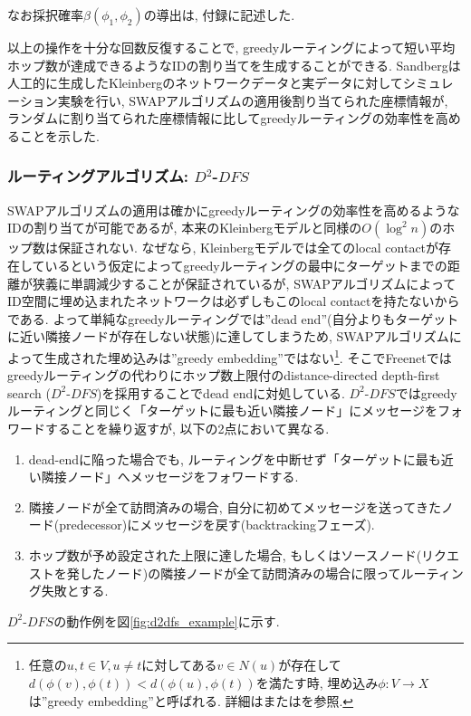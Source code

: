 \documentclass[dvipdfmx]{ampbt}
\begin{document}
   なお採択確率$\beta(\phi_1,\phi_2)$の導出は, 付録に記述した.

   以上の操作を十分な回数反復することで, greedyルーティングによって短い平均ホップ数が達成できるようなIDの割り当てを生成することができる. Sandbergは人工的に生成したKleinbergのネットワークデータと実データに対してシミュレーション実験を行い, SWAPアルゴリズムの適用後割り当てられた座標情報が, ランダムに割り当てられた座標情報に比してgreedyルーティングの効率性を高めることを示した.

   \subsubsection{ルーティングアルゴリズム: $D^2$-$DFS$}
   SWAPアルゴリズムの適用は確かにgreedyルーティングの効率性を高めるようなIDの割り当てが可能であるが, 本来のKleinbergモデルと同様の$O(\log^2n)$のホップ数は保証されない. なぜなら, Kleinbergモデルでは全てのlocal contactが存在しているという仮定によってgreedyルーティングの最中にターゲットまでの距離が狭義に単調減少することが保証されているが, SWAPアルゴリズムによってID空間に埋め込まれたネットワークは必ずしもこのlocal contactを持たないからである. よって単純なgreedyルーティングでは''dead end''(自分よりもターゲットに近い隣接ノードが存在しない状態)に達してしまうため, SWAPアルゴリズムによって生成された埋め込みは''greedy embedding''ではない\footnote{任意の$u,t \in V, u\neq t$に対してある$v \in N(u)$が存在して$d(\phi(v), \phi(t)) < d(\phi(u), \phi(t))$を満たす時, 埋め込み$\phi:V \to X$は''greedy embedding''と呼ばれる. 詳細は\cite{papadimitriou2005conjecture}または\cite{kleinberg2007geographic}を参照.}. そこでFreenetではgreedyルーティングの代わりにホップ数上限付のdistance-directed depth-first search ($D^2$-$DFS$)を採用することでdead endに対処している. $D^2$-$DFS$ではgreedyルーティングと同じく「ターゲットに最も近い隣接ノード」にメッセージをフォワードすることを繰り返すが, 以下の2点において異なる.
   \begin{enumerate}
    \item dead-endに陥った場合でも, ルーティングを中断せず「ターゲットに最も近い隣接ノード」へメッセージをフォワードする. 
    \item 隣接ノードが全て訪問済みの場合, 自分に初めてメッセージを送ってきたノード(predecessor)にメッセージを戻す(backtrackingフェーズ).
    \item ホップ数が予め設定された上限に達した場合, もしくはソースノード(リクエストを発したノード)の隣接ノードが全て訪問済みの場合に限ってルーティング失敗とする.
   \end{enumerate}
   $D^2$-$DFS$の動作例を図\ref{fig:d2dfs_example}に示す.
\end{document}
